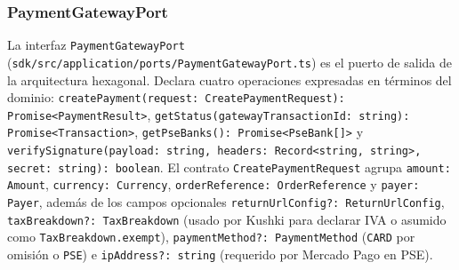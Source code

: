 \subsubsection{PaymentGatewayPort}
La interfaz \texttt{Payment\allowbreak{}Gateway\allowbreak{}Port} (\texttt{sdk/\allowbreak{}src/\allowbreak{}application/\allowbreak{}ports/\allowbreak{}Payment\allowbreak{}Gateway\allowbreak{}Port.ts}) es el puerto de salida de la arquitectura hexagonal. Declara cuatro operaciones expresadas en términos del dominio: \texttt{createPayment(\allowbreak{}request: Create\allowbreak{}Payment\allowbreak{}Request): Promise<\allowbreak{}PaymentResult>}, \texttt{getStatus(\allowbreak{}gateway\allowbreak{}Transaction\allowbreak{}Id: string): Promise<\allowbreak{}Transaction>}, \texttt{getPseBanks(): Promise<\allowbreak{}PseBank[]>} y \texttt{verify\allowbreak{}Signature(\allowbreak{}payload: string, headers: Record<\allowbreak{}string, string>, secret: string): boolean}. El contrato \texttt{Create\allowbreak{}Payment\allowbreak{}Request} agrupa \texttt{amount: Amount}, \texttt{currency: Currency}, \texttt{orderReference: OrderReference} y \texttt{payer: Payer}, además de los campos opcionales \texttt{return\allowbreak{}Url\allowbreak{}Config?: Return\allowbreak{}Url\allowbreak{}Config}, \texttt{taxBreakdown?: TaxBreakdown} (usado por Kushki para declarar IVA o asumido como \texttt{TaxBreakdown.\allowbreak{}exempt}), \texttt{paymentMethod?: PaymentMethod} (\texttt{CARD} por omisión o \texttt{PSE}) e \texttt{ipAddress?: string} (requerido por Mercado Pago en PSE).

